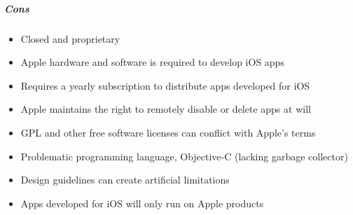 	\subparagraph{Cons}
		\begin{itemize}
			\item Closed and proprietary
			\item Apple hardware and software is required to develop iOS apps
			\item Requires a yearly subscription to distribute apps developed
			for iOS
			\item Apple maintains the right to remotely disable or delete apps
			at will
			\item GPL and other free software licenses can conflict with
			Apple's terms
			\item Problematic programming language, Objective-C (lacking garbage collector)
			\item Design guidelines can create artificial limitations
			\item Apps developed for iOS will only run on Apple products
		\end{itemize}



